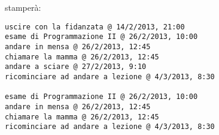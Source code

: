 \documentclass{article}[10pt]
\begin{document}
\noindent
stamper\`a:
%
{\small
\begin{verbatim}
uscire con la fidanzata @ 14/2/2013, 21:00
esame di Programmazione II @ 26/2/2013, 10:00
andare in mensa @ 26/2/2013, 12:45
chiamare la mamma @ 26/2/2013, 12:45
andare a sciare @ 27/2/2013, 9:10
ricominciare ad andare a lezione @ 4/3/2013, 8:30

esame di Programmazione II @ 26/2/2013, 10:00
andare in mensa @ 26/2/2013, 12:45
chiamare la mamma @ 26/2/2013, 12:45
ricominciare ad andare a lezione @ 4/3/2013, 8:30
\end{verbatim}}
%
\end{document}
